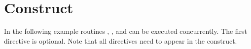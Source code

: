 \pagebreak
\section{ Construct}
\label{sec:psections}

In the following example routines , , and  can 
be executed concurrently. The first  directive is optional. Note 
that all  directives need to appear in the 
 construct.



